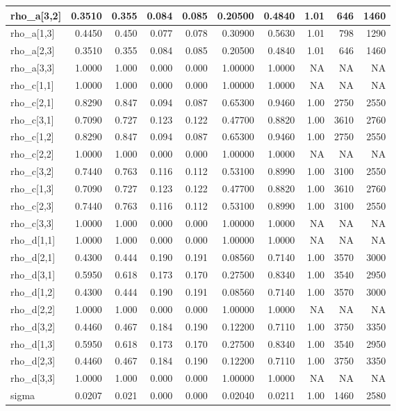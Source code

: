 \documentclass[
]{article}
\begin{document}
\begin{longtable*}[t]{l|r|r|r|r|r|r|r|r|r}
\hline
rho\_a[3,2] & 0.3510 & 0.355 & 0.084 & 0.085 & 0.20500 & 0.4840 & 1.01 & 646 & 1460\\
\hline
rho\_a[1,3] & 0.4450 & 0.450 & 0.077 & 0.078 & 0.30900 & 0.5630 & 1.01 & 798 & 1290\\
\hline
rho\_a[2,3] & 0.3510 & 0.355 & 0.084 & 0.085 & 0.20500 & 0.4840 & 1.01 & 646 & 1460\\
\hline
rho\_a[3,3] & 1.0000 & 1.000 & 0.000 & 0.000 & 1.00000 & 1.0000 & NA & NA & NA\\
\hline
rho\_c[1,1] & 1.0000 & 1.000 & 0.000 & 0.000 & 1.00000 & 1.0000 & NA & NA & NA\\
\hline
rho\_c[2,1] & 0.8290 & 0.847 & 0.094 & 0.087 & 0.65300 & 0.9460 & 1.00 & 2750 & 2550\\
\hline
rho\_c[3,1] & 0.7090 & 0.727 & 0.123 & 0.122 & 0.47700 & 0.8820 & 1.00 & 3610 & 2760\\
\hline
rho\_c[1,2] & 0.8290 & 0.847 & 0.094 & 0.087 & 0.65300 & 0.9460 & 1.00 & 2750 & 2550\\
\hline
rho\_c[2,2] & 1.0000 & 1.000 & 0.000 & 0.000 & 1.00000 & 1.0000 & NA & NA & NA\\
\hline
rho\_c[3,2] & 0.7440 & 0.763 & 0.116 & 0.112 & 0.53100 & 0.8990 & 1.00 & 3100 & 2550\\
\hline
rho\_c[1,3] & 0.7090 & 0.727 & 0.123 & 0.122 & 0.47700 & 0.8820 & 1.00 & 3610 & 2760\\
\hline
rho\_c[2,3] & 0.7440 & 0.763 & 0.116 & 0.112 & 0.53100 & 0.8990 & 1.00 & 3100 & 2550\\
\hline
rho\_c[3,3] & 1.0000 & 1.000 & 0.000 & 0.000 & 1.00000 & 1.0000 & NA & NA & NA\\
\hline
rho\_d[1,1] & 1.0000 & 1.000 & 0.000 & 0.000 & 1.00000 & 1.0000 & NA & NA & NA\\
\hline
rho\_d[2,1] & 0.4300 & 0.444 & 0.190 & 0.191 & 0.08560 & 0.7140 & 1.00 & 3570 & 3000\\
\hline
rho\_d[3,1] & 0.5950 & 0.618 & 0.173 & 0.170 & 0.27500 & 0.8340 & 1.00 & 3540 & 2950\\
\hline
rho\_d[1,2] & 0.4300 & 0.444 & 0.190 & 0.191 & 0.08560 & 0.7140 & 1.00 & 3570 & 3000\\
\hline
rho\_d[2,2] & 1.0000 & 1.000 & 0.000 & 0.000 & 1.00000 & 1.0000 & NA & NA & NA\\
\hline
rho\_d[3,2] & 0.4460 & 0.467 & 0.184 & 0.190 & 0.12200 & 0.7110 & 1.00 & 3750 & 3350\\
\hline
rho\_d[1,3] & 0.5950 & 0.618 & 0.173 & 0.170 & 0.27500 & 0.8340 & 1.00 & 3540 & 2950\\
\hline
rho\_d[2,3] & 0.4460 & 0.467 & 0.184 & 0.190 & 0.12200 & 0.7110 & 1.00 & 3750 & 3350\\
\hline
rho\_d[3,3] & 1.0000 & 1.000 & 0.000 & 0.000 & 1.00000 & 1.0000 & NA & NA & NA\\
\hline
sigma & 0.0207 & 0.021 & 0.000 & 0.000 & 0.02040 & 0.0211 & 1.00 & 1460 & 2580\\
\hline
\end{longtable*}
\endgroup{}
\end{document}
